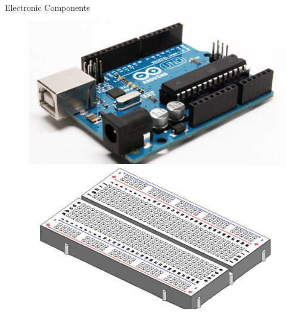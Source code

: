 \begin{itemize}
\begin{itemize}
	\begin{marginfigure}
		\caption{Electronic Components}
	\end{marginfigure}
	\begin{figure}[!h]
			\includegraphics[width=1.0\linewidth]{figs/04/uno}
		\endminipage
			\includegraphics[width=1.0\linewidth]{figs/04/MiniBreadBoard}
		\endminipage\hfill
	\end{figure}
	
	\hfill
	

\end{itemize}
\end{itemize}
